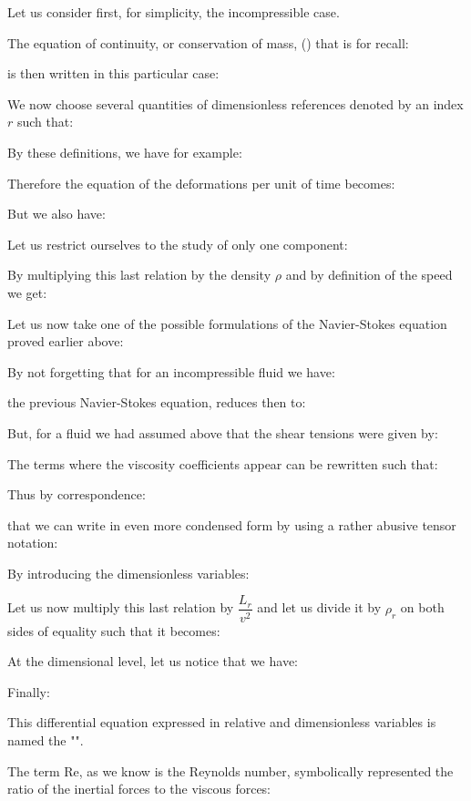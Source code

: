 	Let us consider first, for simplicity, the incompressible case.

	The equation of continuity, or conservation of mass, () that is for recall:
	
	is then written in this particular case:
	
	We now choose several quantities of dimensionless references denoted by an index $r$ such that:
	
	By these definitions, we have for example:
	
	Therefore the equation of the deformations per unit of time becomes:
	
	But we also have:
	
	Let us restrict ourselves to the study of only one component:
	
	By multiplying this last relation by the density $\rho$ and by definition of the speed we get:
	
	Let us now take one of the possible formulations of the Navier-Stokes equation proved earlier above:
	
	By not forgetting that for an incompressible fluid we have:
	
	the previous Navier-Stokes equation, reduces then to:
	
	But, for a fluid we had assumed above that the shear tensions were given by:
	
	The terms where the viscosity coefficients appear can be rewritten such that:
	
	Thus by correspondence:
	
	that we can write in even more condensed form by using a rather abusive tensor notation:
	
	By introducing the dimensionless variables:
	
	Let us now multiply this last relation by $\dfrac{L_r}{v^2}$ and let us divide it by $\rho_r$ on both sides of equality such that it becomes:
	
	At the dimensional level, let us notice that we have:
	
	Finally:
	
	This differential equation expressed in relative and dimensionless variables is named the "".

	The term Re, as we know is the Reynolds number, symbolically represented the ratio of the inertial forces to the viscous forces:
	
